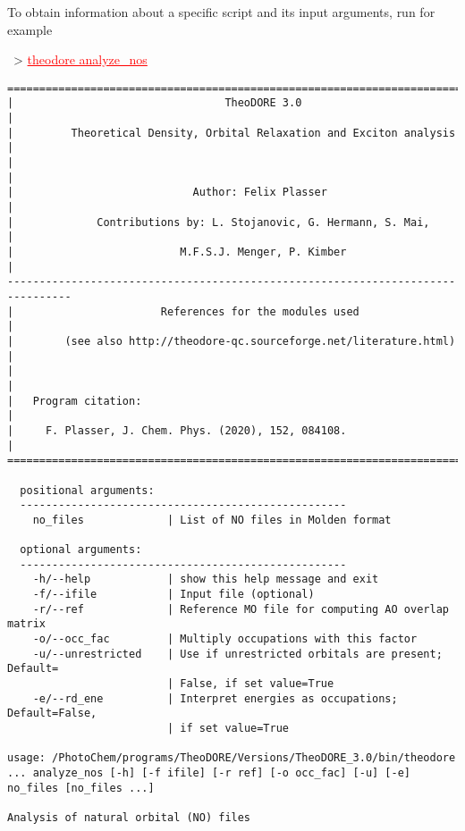 \documentclass[DIV=12,headings=normal]{scrartcl}
\newcommand{\redl}[1]{{\textcolor{red}{\underline{#1}}}}
\newcommand{\comm}[1]{
\small
~> \redl{#1}
\normalsize
}
\begin{document}
To obtain information about a specific script and its input arguments, run for example

\comm{theodore analyze\_nos}

\scriptsize
\begin{Verbatim}[commandchars=\\\{\}]
================================================================================
|                                 TheoDORE 3.0                                 |
|         Theoretical Density, Orbital Relaxation and Exciton analysis         |
|                                                                              |
|                            Author: Felix Plasser                             |
|             Contributions by: L. Stojanovic, G. Hermann, S. Mai,             |
|                          M.F.S.J. Menger, P. Kimber                          |
--------------------------------------------------------------------------------
|                       References for the modules used                        |
|        (see also http://theodore-qc.sourceforge.net/literature.html)         |
|                                                                              |
|   Program citation:                                                          |
|     F. Plasser, J. Chem. Phys. (2020), 152, 084108.                          |
================================================================================

  positional arguments:
  ---------------------------------------------------
    no_files             | List of NO files in Molden format                 

  optional arguments:
  ---------------------------------------------------
    -h/--help            | show this help message and exit                   
    -f/--ifile           | Input file (optional)                             
    -r/--ref             | Reference MO file for computing AO overlap matrix 
    -o/--occ_fac         | Multiply occupations with this factor             
    -u/--unrestricted    | Use if unrestricted orbitals are present; Default=
                         | False, if set value=True                          
    -e/--rd_ene          | Interpret energies as occupations; Default=False, 
                         | if set value=True                                 

usage: /PhotoChem/programs/TheoDORE/Versions/TheoDORE_3.0/bin/theodore ... analyze_nos [-h] [-f ifile] [-r ref] [-o occ_fac] [-u] [-e] no_files [no_files ...] 

Analysis of natural orbital (NO) files
\end{Verbatim}
\normalsize
\end{document}
